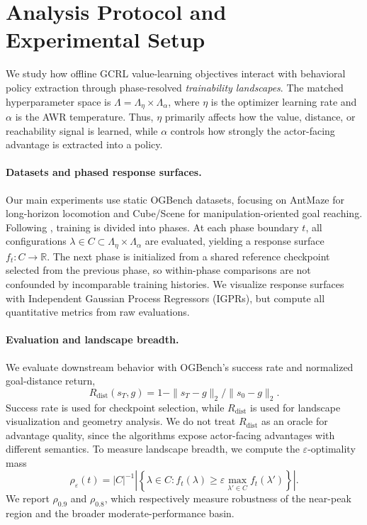 \section{Analysis Protocol and Experimental Setup}
\label{sec:method}


We study how offline GCRL value-learning objectives interact with behavioral policy extraction through phase-resolved \emph{trainability landscapes}.
The matched hyperparameter space is \(\Lambda=\Lambda_{\eta}\times\Lambda_{\alpha}\), where \(\eta\) is the optimizer learning rate and \(\alpha\) is the AWR temperature.
Thus, \(\eta\) primarily affects how the value, distance, or reachability signal is learned, while \(\alpha\) controls how strongly the actor-facing advantage is extracted into a policy.

\paragraph{Datasets and phased response surfaces.}
Our main experiments use static OGBench datasets, focusing on AntMaze for long-horizon locomotion and Cube/Scene for manipulation-oriented goal reaching.
Following \citet{mohan-automlconf23a}, training is divided into phases.
At each phase boundary \(t\), all configurations \(\lambda\in C\subset\Lambda_{\eta}\times\Lambda_{\alpha}\) are evaluated, yielding a response surface \(f_t:C\to\mathbb{R}\).
The next phase is initialized from a shared reference checkpoint selected from the previous phase, so within-phase comparisons are not confounded by incomparable training histories.
We visualize response surfaces with Independent Gaussian Process Regressors (IGPRs), but compute all quantitative metrics from raw evaluations.

\paragraph{Evaluation and landscape breadth.}
We evaluate downstream behavior with OGBench's success rate and normalized goal-distance return,
\[
    R_{\mathrm{dist}}(s_T,g)=1-\|s_T-g\|_2/\|s_0-g\|_2.
\]
Success rate is used for checkpoint selection, while \(R_{\mathrm{dist}}\) is used for landscape visualization and geometry analysis.
We do not treat \(R_{\mathrm{dist}}\) as an oracle for advantage quality, since the algorithms expose actor-facing advantages with different semantics.
To measure landscape breadth, we compute the \(\varepsilon\)-optimality mass
\[
    \rho_{\varepsilon}(t) = |C|^{-1} \left| \left\{ \lambda\in C: f_t(\lambda)\ge \varepsilon\max_{\lambda'\in C}f_t(\lambda') \right\} \right|.
\]
We report \(\rho_{0.9}\) and \(\rho_{0.8}\), which respectively measure robustness of the near-peak region and the broader moderate-performance basin.

